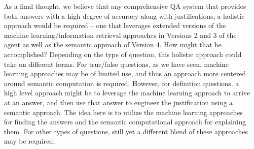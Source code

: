 As a final thought, we believe that any comprehensive QA system that provides both answers with a high degree of accuracy along with justifications, a holistic approach would be required – one that leverages extended versions of the machine learning/information retrieval approaches in Versions 2 and 3 of the agent as well as the semantic approach of Version 4. How might that be accomplished? Depending on the type of question, this holistic approach could take on different forms. For true/false questions, as we have seen, machine learning approaches may be of limited use, and thus an approach more centered around semantic computation is required.  However, for definition questions, a high level approach might be to leverage the machine learning approach to arrive at an answer, and then use that answer to engineer the justification using a semantic approach.  The idea here is to utilize the machine learning approaches for finding the answers and the semantic computational approach for explaining them. For other types of questions, still yet a different blend of these approaches may be required.